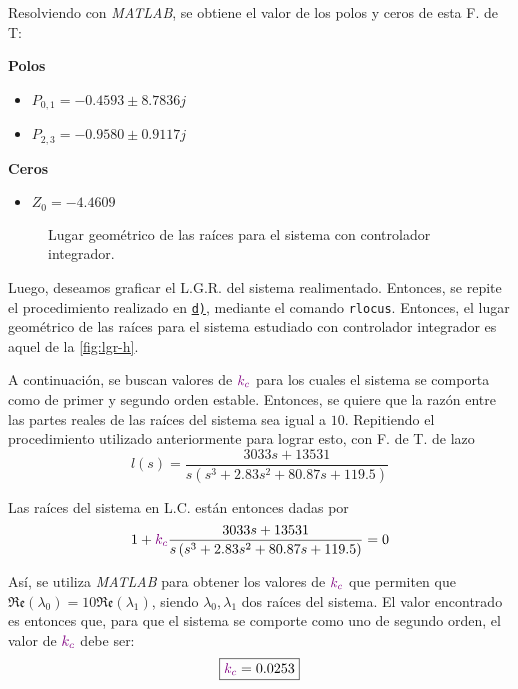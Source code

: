 Resolviendo con \textit{MATLAB}, se obtiene el valor de los polos y ceros de esta F. de T:

\begin{multicols}{2}
    \textbf{Polos}
    \begin{itemize}
        \item \(P_{0,1} = -0.4593 \pm 8.7836j\)
        \item \(P_{2,3} = -0.9580 \pm 0.9117j\)
    \end{itemize}

    \columnbreak

    \textbf{Ceros}
    \begin{itemize}
        \item \(Z_0 = -4.4609\)
    \end{itemize}
\end{multicols}

\begin{figure}[ht]
    \centering
    
    \caption{Lugar geométrico de las raíces para el sistema con controlador integrador.}
    \label{fig:lgr-h}
\end{figure}

Luego, deseamos graficar el L.G.R. del sistema realimentado. Entonces, se repite
el procedimiento realizado en \hyperref[pregunta-d]{\texttt{d)}}, mediante el
comando \verb|rlocus|. Entonces, el lugar geométrico de las raíces para el sistema
estudiado con controlador integrador es aquel de la \autoref{fig:lgr-h}.

A continuación, se buscan valores de $\mathbin{\color{violet}k_{c}}$ para los cuales el sistema se
comporta como de primer y segundo orden estable. Entonces, se quiere que la razón
entre las partes reales de las raíces del sistema sea igual a $10$. Repitiendo
el procedimiento utilizado anteriormente para lograr esto, con F. de T. de lazo
\begin{equation}
    l(s) = \frac{3033s + 13531}{s\left(s^{3} + 2.83s^{2} + 80.87s + 119.5\right)}
\end{equation}

Las raíces del sistema en L.C. están entonces dadas por
\begin{equation}
    1 + \mathbin{\color{violet}k_{c}}\frac{3033s + 13531}{s\left(s^{3} + 2.83s^{2} + 80.87s + 119.5\right)} = 0
\end{equation}

Así, se utiliza \textit{MATLAB} para obtener los valores de $\mathbin{\color{violet}k_{c}}$ que
permiten que $\mathfrak{Re}(\lambda_{0}) = 10\mathfrak{Re}(\lambda_{1})$, siendo
$\lambda_{0}, \lambda_{1}$ dos raíces del sistema. El valor encontrado es entonces
que, para que el sistema se comporte como uno de segundo orden, el valor de
$\mathbin{\color{violet}k_{c}}$ debe ser:
\begin{equation}
    \boxed{\mathbin{\color{violet}k_{c}} = 0.0253}
\end{equation}

